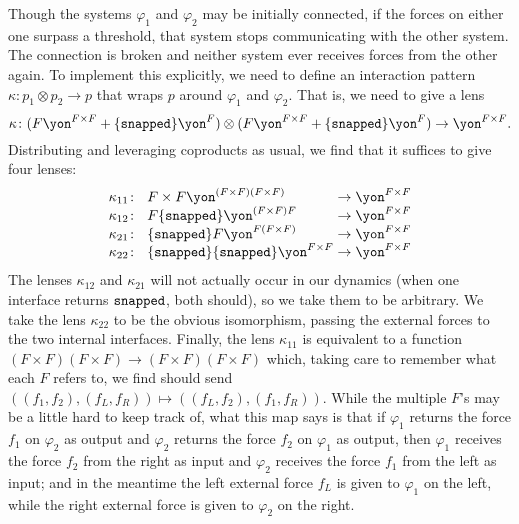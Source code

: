 \documentclass[Book-Poly]{subfiles}
\begin{document}
\begin{example}
Though the systems $\varphi_1$ and $\varphi_2$ may be initially connected, if the forces on either one surpass a threshold, that system stops communicating with the other system.
The connection is broken and neither system ever receives forces from the other again. To implement this explicitly, we need to define an interaction pattern $\kappa\colon p_1\otimes p_2\to p$ that wraps $p$ around $\varphi_1$ and $\varphi_2$.
That is, we need to give a lens
\[
    \kappa\colon (F\yon^{F\times F}+\{\const{snapped}\}\yon^F)\otimes (F\yon^{F\times F}+\{\const{snapped}\}\yon^F)\to\yon^{F\times F}.
\]
Distributing and leveraging coproducts as usual, we find that it suffices to give four lenses:
\begin{equation}\label{eqn.snapped_maps}
\arraycolsep=1.4pt
\begin{array}{lll}
	\kappa_{11}\colon&~ F\times F\yon^{(F\times F)(F\times F)}&\to\yon^{F\times F}\\
	\kappa_{12}\colon&~ F\{\const{snapped}\}\yon^{(F\times F)F}&\to\yon^{F\times F}\\
	\kappa_{21}\colon&~ \{\const{snapped}\}F\yon^{F(F\times F)}&\to\yon^{F\times F}\\
	\kappa_{22}\colon&~ \{\const{snapped}\}\{\const{snapped}\}\yon^{F\times F}&\to\yon^{F\times F}
\end{array}
\end{equation}
The lenses $\kappa_{12}$ and $\kappa_{21}$ will not actually occur in our dynamics (when one interface returns $\texttt{snapped}$, both should), so we take them to be arbitrary.
We take the lens $\kappa_{22}$ to be the obvious isomorphism, passing the external forces to the two internal interfaces.
Finally, the lens $\kappa_{11}$ is equivalent to a function $(F\times F)(F\times F)\to (F\times F)(F\times F)$ which, taking care to remember what each $F$ refers to, we find should send $((f_1,f_2),(f_L,f_R))\mapsto((f_L,f_2),(f_1,f_R))$.
While the multiple $F$'s may be a little hard to keep track of, what this map says is that if $\varphi_1$ returns the force $f_1$ on $\varphi_2$ as output and $\varphi_2$ returns the force $f_2$ on $\varphi_1$ as output, then $\varphi_1$ receives the force $f_2$ from the right as input and $\varphi_2$ receives the force $f_1$ from the left as input; and in the meantime the left external force $f_L$ is given to $\varphi_1$ on the left, while the right external force is given to $\varphi_2$ on the right.


\end{example}
\end{document}
